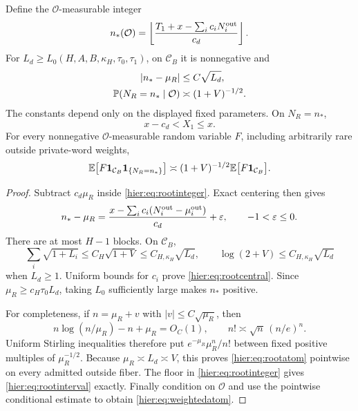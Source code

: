 \begin{theorem}\label{hier:thm:reservoir}
Define the $\mathcal O$-measurable integer
\begin{equation}
 n_*(\mathcal O)=
 \left\lfloor\frac{T_1+x-\sum_i c_iN_i^{\rm out}}{c_d}\right\rfloor.
 \label{hier:eq:rootinteger}
\end{equation}
For $L_d\ge L_0(H,A,B,\kappa_H,\tau_0,\tau_1)$, on
$\mathcal C_B$ it is nonnegative and
\begin{align}
 |n_*-\mu_R|&\le C\sqrt{L_d},\label{hier:eq:rootcentral}\\
 \mathbb P(N_R=n_*\mid\mathcal O)&\asymp (1+V)^{-1/2}.
 \label{hier:eq:rootatom}
\end{align}
The constants depend only on the displayed fixed parameters. On
$N_R=n_*$,
\begin{equation}
 x-c_d<X_1\le x. \label{hier:eq:rootinterval}
\end{equation}
For every nonnegative $\mathcal O$-measurable random variable $F$,
including arbitrarily rare outside private-word weights,
\begin{equation}
 \mathbb E\bigl[F\mathbf 1_{\mathcal C_B}\mathbf 1_{\{N_R=n_*\}}\bigr]
 \asymp (1+V)^{-1/2}\mathbb E\bigl[F\mathbf 1_{\mathcal C_B}\bigr].
 \label{hier:eq:weightedatom}
\end{equation}
\end{theorem}
\begin{proof}
Subtract $c_d\mu_R$ inside \eqref{hier:eq:rootinteger}. Exact centering
then gives
\[
 n_*-\mu_R=
 \frac{x-\sum_ic_i(N_i^{\rm out}-\mu_i^{\rm out})}{c_d}
 +\varepsilon,\qquad -1<\varepsilon\le0.
\]
There are at most $H-1$ blocks. On $\mathcal C_B$,
\[
 \sum_i\sqrt{1+L_i}\le C_H\sqrt{1+V}
 \le C_{H,\kappa_H}\sqrt{L_d},
 \qquad \log(2+V)\le C_{H,\kappa_H}\sqrt{L_d}
\]
when $L_d\ge1$. Uniform bounds for $c_i$ prove
\eqref{hier:eq:rootcentral}. Since $\mu_R\ge c_H\tau_0L_d$, taking
$L_0$ sufficiently large makes $n_*$ positive.

For completeness, if $n=\mu_R+v$ with $|v|\le C\sqrt{\mu_R}$,
then
\[
 n\log(n/\mu_R)-n+\mu_R=O_C(1),
 \qquad n!\asymp \sqrt n\,(n/e)^n.
\]
Uniform Stirling inequalities therefore put
$e^{-\mu_R}\mu_R^n/n!$ between fixed positive multiples of
$\mu_R^{-1/2}$. Because $\mu_R\asymp L_d\asymp V$, this proves
\eqref{hier:eq:rootatom} pointwise on every admitted outside fiber.
The floor in \eqref{hier:eq:rootinteger} gives \eqref{hier:eq:rootinterval}
exactly. Finally condition on $\mathcal O$ and use the pointwise
conditional estimate to obtain \eqref{hier:eq:weightedatom}.
\end{proof}

